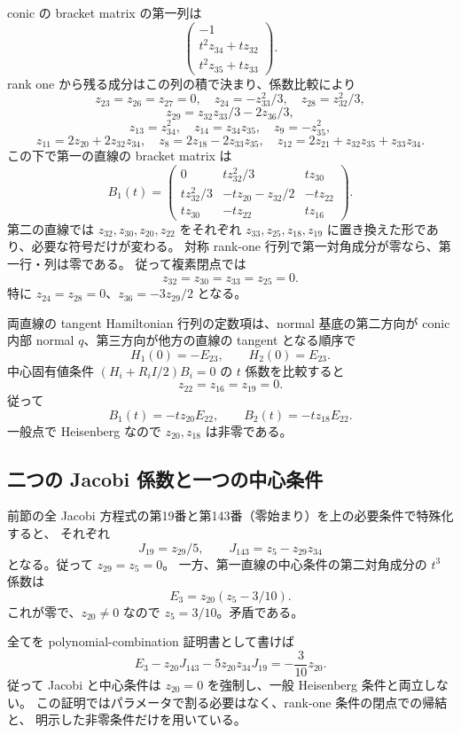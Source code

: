 \documentclass[11pt,a4paper]{ltjsarticle}
\theoremstyle{remark}\newtheorem{remark}[theorem]{注意}
\begin{document}
conic の bracket matrix の第一列は
\[
\begin{pmatrix}-1\\t^2z_{34}+tz_{32}\\t^2z_{35}+tz_{33}\end{pmatrix}.
\]
rank one から残る成分はこの列の積で決まり、係数比較により
\[
z_{23}=z_{26}=z_{27}=0,\quad
z_{24}=-z_{33}^2/3,\quad z_{28}=z_{32}^2/3,
\]
\[
z_{29}=z_{32}z_{33}/3-2z_{36}/3,
\]
\[
z_{13}=z_{34}^2,\quad z_{14}=z_{34}z_{35},\quad z_9=-z_{35}^2,
\]
\[
z_{11}=2z_{20}+2z_{32}z_{34},\quad
z_8=2z_{18}-2z_{33}z_{35},\quad
z_{12}=2z_{21}+z_{32}z_{35}+z_{33}z_{34}.
\]
この下で第一の直線の bracket matrix は
\[
B_1(t)=
\begin{pmatrix}
0&tz_{32}^2/3&tz_{30}\\
tz_{32}^2/3&-tz_{20}-z_{32}/2&-tz_{22}\\
tz_{30}&-tz_{22}&tz_{16}
\end{pmatrix}.
\]
第二の直線では $z_{32},z_{30},z_{20},z_{22}$ をそれぞれ
$z_{33},z_{25},z_{18},z_{19}$ に置き換えた形であり、必要な符号だけが変わる。
対称 rank-one 行列で第一対角成分が零なら、第一行・列は零である。
従って複素閉点では
\[
z_{32}=z_{30}=z_{33}=z_{25}=0.
\]
特に $z_{24}=z_{28}=0$、$z_{36}=-3z_{29}/2$ となる。

両直線の tangent Hamiltonian 行列の定数項は、normal 基底の第二方向が
conic 内部 normal $q$、第三方向が他方の直線の tangent となる順序で
\[
H_1(0)=-E_{23},\qquad H_2(0)=E_{23}.
\]
中心固有値条件 $(H_i+R_i I/2)B_i=0$ の $t$ 係数を比較すると
\[
z_{22}=z_{16}=z_{19}=0.
\]
従って
\[
B_1(t)=-tz_{20}E_{22},\qquad B_2(t)=-tz_{18}E_{22}.
\]
一般点で Heisenberg なので $z_{20},z_{18}$ は非零である。

\subsection{二つの Jacobi 係数と一つの中心条件}

前節の全 Jacobi 方程式の第19番と第143番（零始まり）を上の必要条件で特殊化すると、
それぞれ
\[
J_{19}=z_{29}/5,\qquad J_{143}=z_5-z_{29}z_{34}
\]
となる。従って $z_{29}=z_5=0$。
一方、第一直線の中心条件の第二対角成分の $t^3$ 係数は
\[
E_3=z_{20}(z_5-3/10).
\]
これが零で、$z_{20}\ne0$ なので $z_5=3/10$。矛盾である。

全てを polynomial-combination 証明書として書けば
\[
E_3-z_{20}J_{143}-5z_{20}z_{34}J_{19}
=-\frac3{10}z_{20}.
\]
従って Jacobi と中心条件は $z_{20}=0$ を強制し、一般 Heisenberg 条件と両立しない。
この証明ではパラメータで割る必要はなく、rank-one 条件の閉点での帰結と、
明示した非零条件だけを用いている。
\end{document}
